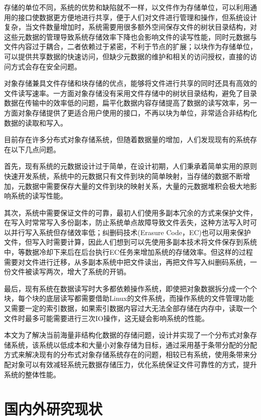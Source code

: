 存储的单位不同，系统的优势和缺陷就不一样，以文件作为存储单位，可以利用通用的接口使数据更方便地进行共享，便于人们对文件进行管理和操作，但系统设计复杂\cite{20}，当文件数量增加时，系统需要用很多额外空间保存文件的树状目录结构，对这些元数据的管理导致系统存储效率下降也会影响文件的读写性能，同时元数据与文件内容过于耦合，二者依赖过于紧密，不利于节点的扩展；以块作为存储单位，可以提供共享数据的快速访问，但缺少元数据的维护和相关的访问授权，直接的访问方式会存在安全问题\cite{21}。

对象存储兼具文件存储和块存储的优点，能够将文件进行共享的同时还具有高效的文件读写速率\cite{22}。一方面对象存储没有采用文件存储中的树状目录结构，避免了目录数据在传输中的效率低的问题，扁平化数据内容存储提高了数据的读写效率，另一方面对象存储提供了更适合用户使用的接口，不再以块为单位，非常适合非结构化数据的读取和写入。

目前存在许多分布式对象存储系统，但随着数据量的增加，人们发现现有的系统存在以下几点问题。

首先，现有系统的元数据设计过于简单，在设计初期，人们秉承着简单实用的原则快速开发系统，系统中的元数据只有文件到块的简单映射，当存储的数据不断增加，元数据中需要保存大量的文件到块的映射关系，大量的元数据堆积会极大地影响系统的读写性能。

其次，系统中需要保证文件的可靠，最初人们使用多副本冗余的方式来保护文件，在写入时常常写入多份副本，防止系统单点故障导致文件丢失，这种方法写入时可以并行写入系统但存储效率低；纠删码技术(Erasure Code，EC)也可以用来保护文件，但写入时需要计算，因此人们想到可以先使用多副本技术将文件保存到系统中，等数据冷却下来后在后台执行EC任务来增加系统的存储效率。但这样的过程需要对文件进行迁移，从多副本系统中把文件读出，再把文件写入纠删码系统，一份文件被读写两次，增大了系统的开销。

最后，现有系统在数据读写时大多都依赖操作系统，即使把对象数据拆分成一个个块，每个块的底层读写都需要借助Linux的文件系统，而操作系统的文件管理功能又需要一定的索引数据，如果索引数据内容过大无法全部存储在内存中，读取一个文件时最多可能需要进行三次IO操作，这无疑会影响系统的性能。

本文为了解决当前海量非结构化数据的存储问题，设计并实现了一个分布式对象存储系统，该系统以低成本和大量小对象存储为目标，通过采用基于条带分配的分配方式来解决现有的分布式对象存储系统存在的问题，相较已有系统，使用条带来分配对象可以有效减轻系统元数据存储压力，优化系统保证文件可靠性的方式，提升系统的整体性能。

\section{国内外研究现状}%
